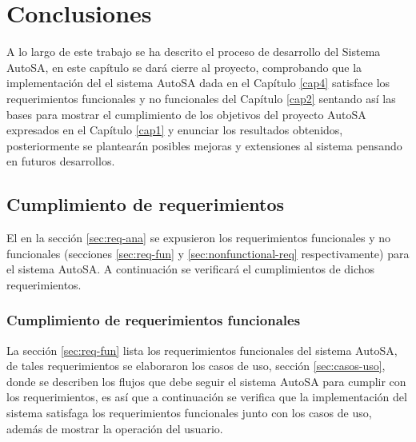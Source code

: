 \chapter{Conclusiones}\label{cap5}

A lo largo de este trabajo se ha descrito el proceso de desarrollo del Sistema AutoSA, en este capítulo se dará cierre al proyecto, comprobando que la implementación del el sistema AutoSA dada en el Capítulo \ref{cap4} satisface los requerimientos funcionales y no funcionales del Capítulo \ref{cap2} sentando así las bases para mostrar el cumplimiento de los objetivos del proyecto AutoSA expresados en el Capítulo \ref{cap1} y enunciar los resultados obtenidos, posteriormente se plantearán posibles mejoras y extensiones al sistema pensando en futuros desarrollos.

\section{Cumplimiento de requerimientos}
El en la sección \ref{sec:req-ana} se expusieron los requerimientos funcionales y no funcionales (secciones \ref{sec:req-fun} y \ref{sec:nonfunctional-req} respectivamente) para el sistema AutoSA. A continuación se verificará el cumplimientos de dichos requerimientos.

\subsection{Cumplimiento de requerimientos funcionales}
La sección \ref{sec:req-fun} lista los requerimientos funcionales del sistema AutoSA, de tales requerimientos se elaboraron los casos de uso, sección \ref{sec:casos-uso}, donde se describen los flujos que debe seguir el sistema AutoSA para cumplir con los requerimientos, es así que a continuación se verifica que la implementación del sistema satisfaga los requerimientos funcionales junto con los casos de uso, además de mostrar la operación del usuario.

